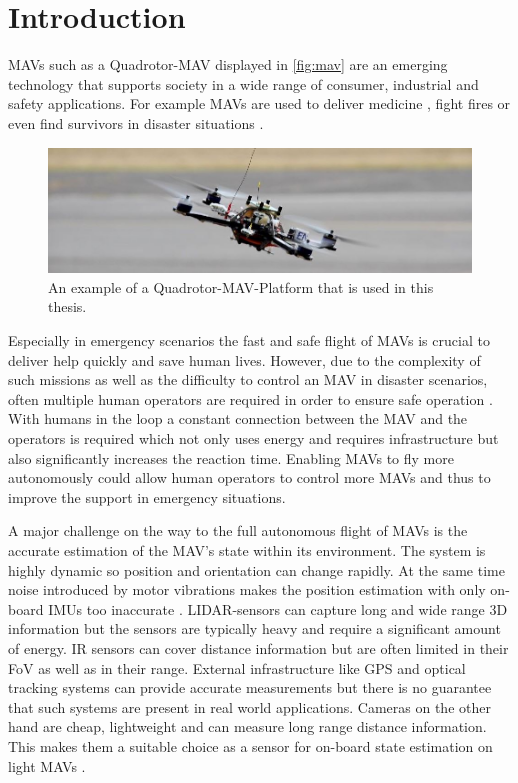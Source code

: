 \chapter{Introduction}
\label{sec:intro}
\acresetall
\acp{MAV} such as a Quadrotor-\ac{MAV} displayed in \autoref{fig:mav} are an emerging technology that supports society in a wide range of consumer, industrial and safety applications. For example \acp{MAV} are used to deliver medicine \cite{Shankland2018}, fight fires \cite{KateBaggaley2017} or even find survivors in disaster situations \cite{JoshuaBateman2017}.

\begin{figure}[b]
	\centering
	\includegraphics[width=\textwidth]{fig/mav}
	\caption{An example of a Quadrotor-\ac{MAV}-Platform that is used in this thesis.}
	\label{fig:mav}
\end{figure}

Especially in emergency scenarios the fast and safe flight of \acp{MAV} is crucial to deliver help quickly and save human lives. However, due to the complexity of such missions as well as the difficulty to control an \ac{MAV} in disaster scenarios, often multiple human operators are required in order to ensure safe operation \cite{Murphy2016}. With humans in the loop a constant connection between the \ac{MAV} and the operators is required which not only uses energy and requires infrastructure but also significantly increases the reaction time. Enabling \acp{MAV} to fly more autonomously could allow human operators to control more \acp{MAV} and thus to improve the support in emergency situations.

A major challenge on the way to the full autonomous flight of \acp{MAV} is the accurate estimation of the \ac{MAV}'s state within its environment. The system is highly dynamic so position and orientation can change rapidly. At the same time noise introduced by motor vibrations makes the position estimation with only on-board \acp{IMU} too inaccurate \cite{Mohamed2014}. \ac{LIDAR}-sensors can capture long and wide range 3D information but the sensors are typically heavy and require a significant amount of energy. \ac{IR} sensors can cover distance information but are often limited in their \ac{FoV} as well as in their range. External infrastructure like \ac{GPS} and optical tracking systems can provide accurate measurements but there is no guarantee that such systems are present in real world applications. Cameras on the other hand are cheap, lightweight and can measure long range distance information. This makes them a suitable choice as a sensor for on-board state estimation on light \acp{MAV} \cite{Elbanhawi2017}.

